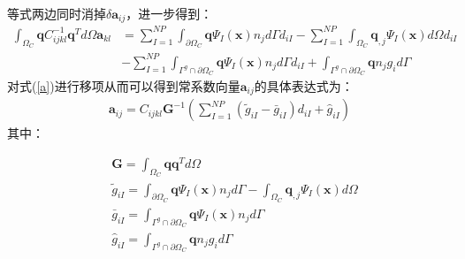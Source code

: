 等式两边同时消掉$\delta\pmb{a}_{ij}$，进一步得到：
\begin{equation}\label{a}
\begin{split}
        \int_{\Omega_C}\pmb{q}C^{-1}_{ijkl}\pmb{q}^Td\Omega\pmb{a}_{kl}&=\sum_{I=1}^{N\!P}\int_{\partial\Omega_C}\pmb{q}\Psi_I(\pmb{x})n_jd\Gamma d_{iI}-\sum_{I=1}^{N\!P}\int_{\Omega_C}\pmb{q}_{,j}\Psi_{I}(\pmb{x})d\Omega d_{iI}\\
         &-\sum_{I=1}^{N\!P}\int_{\Gamma^g\cap\partial\Omega_C}\pmb{q}\Psi_I(\pmb{x})n_jd\Gamma d_{iI}+\int_{\Gamma^g\cap\partial\Omega_C}\pmb{q}n_jg_id\Gamma
\end{split}
\end{equation}
对式(\ref{a})进行移项从而可以得到常系数向量$\pmb{a}_{ij}$的具体表达式为：
\begin{equation}\label{aij}
\begin{split}
 \pmb{a}_{ij}=C_{ijkl}\pmb{G}^{-1}(\sum_{I=1}^{N\!P}(\tilde{g}_{iI}-\bar{g}_{iI})d_{iI}+\hat{g}_{iI})
\end{split}
\end{equation}
其中：

\begin{align}
    \label{g1}&\pmb{G}=\int_{\Omega_C}\pmb{q}\pmb{q}^Td\Omega\\
    \label{g2} &\tilde{g}_{iI}=\int_{\partial\Omega_C}\pmb{q}\Psi_I(\pmb{x})n_jd\Gamma-\int_{\Omega_C}\pmb{q}_{,j}\Psi_{I}(\pmb{x})d\Omega\\
    \label{g3} &\bar{g}_{iI}=\int_{\Gamma^g\cap\partial\Omega_C}\pmb{q}\Psi_I(\pmb{x})n_jd\Gamma\\
   \label{g4} &\hat{g}_{iI}=\int_{\Gamma^g\cap\partial\Omega_C}\pmb{q}n_jg_id\Gamma
\end{align}

